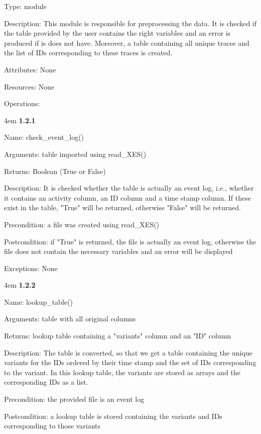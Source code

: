\documentclass[notitlepage]{article}
\begin{document}
\begin{flushleft}
Type: module

Description: This module is responsible for preprocessing the data. It is checked if the table provided by the user contains the right variables and an error is produced if is does not have. Moreover, a table containing all unique traces and the list of IDs corresponding to these traces is created.

Attributes: None

Resources: None

Operations: 
\medskip


\par
\begingroup
\leftskip4em
\textbf{1.2.1} 

Name: check\_event\_log()

Arguments: table imported using read\_XES() 

Returns: Boolean (True or False)

Description: It is checked whether the table is actually an event log, i.e., whether it contains an activity column, an ID column and a time stamp column. If these exist in the table, "True" will be returned, otherwise "False" will be returned. 

Precondition: a file was created using read\_XES()

Postcondition: if "True" is returned, the file is actually an event log, otherwise the file does not contain the necessary variables and an error will be displayed

Exceptions: None
\par
\endgroup

\medskip

\par
\begingroup
\leftskip4em
\textbf{1.2.2}

Name: lookup\_table()

Arguments: table with all original columns

Returns: lookup table containing a "variants" column and an "ID" column

Description: The table is converted, so that we get a table containing the unique variants for the IDs ordered by their time stamp and the set of IDs corresponding to the variant. In this lookup table, the variants are stored as arrays and the corresponding IDs as a list.

Precondition: the provided file is an event log

Postcondition: a lookup table is stored containing the variants and IDs corresponding to those variants


\end{flushleft}
\end{document}
